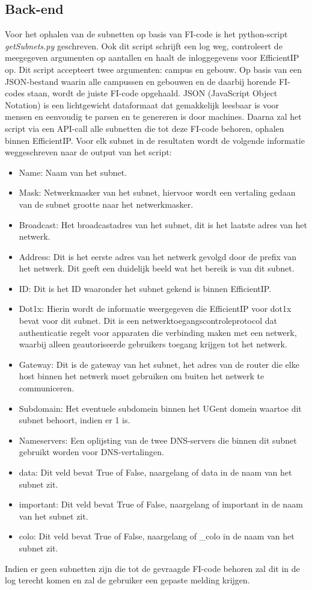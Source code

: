\subsection{Back-end}
Voor het ophalen van de subnetten op basis van FI-code is het python-script \textit{getSubnets.py} geschreven. Ook dit script schrijft een log weg, controleert de meegegeven argumenten op aantallen en haalt de inloggegevens voor EfficientIP op. Dit script accepteert twee argumenten: campus en gebouw. Op basis van een JSON-bestand waarin alle campussen en gebouwen en de daarbij horende FI-codes staan, wordt de juiste FI-code opgehaald. JSON (JavaScript Object Notation) is een lichtgewicht dataformaat dat gemakkelijk leesbaar is voor mensen en eenvoudig te parsen en te genereren is door machines. Daarna zal het script via een API-call alle subnetten die tot deze FI-code behoren, ophalen binnen EfficientIP. Voor elk subnet in de resultaten wordt de volgende informatie weggeschreven naar de output van het script:
\begin{itemize}
    \item Name: Naam van het subnet.
    \item Mask: Netwerkmasker van het subnet, hiervoor wordt een vertaling gedaan van de subnet grootte naar het netwerkmasker.
    \item Broadcast: Het broadcastadres van het subnet, dit is het laatste adres van het netwerk.
    \item Address: Dit is het eerste adres van het netwerk gevolgd door de prefix van het netwerk. Dit geeft een duidelijk beeld wat het bereik is van dit subnet.
    \item ID: Dit is het ID waaronder het subnet gekend is binnen EfficientIP.
    \item Dot1x: Hierin wordt de informatie weergegeven die EfficientIP voor dot1x bevat voor dit subnet. Dit is een netwerktoegangscontroleprotocol dat authenticatie regelt voor apparaten die verbinding maken met een netwerk, waarbij alleen geautoriseerde gebruikers toegang krijgen tot het netwerk.
    \item Gateway: Dit is de gateway van het subnet, het adres van de router die elke host binnen het netwerk moet gebruiken om buiten het netwerk te communiceren.
    \item Subdomain: Het eventuele subdomein binnen het UGent domein waartoe dit subnet behoort, indien er 1 is.
    \item Nameservers: Een oplijsting van de twee DNS-servers die binnen dit subnet gebruikt worden voor DNS-vertalingen.
    \item data: Dit veld bevat True of False, naargelang of data in de naam van het subnet zit.
    \item important: Dit veld bevat True of False, naargelang of important in de naam van het subnet zit.
    \item colo: Dit veld bevat True of False, naargelang of \_colo in de naam van het subnet zit.
\end{itemize}
Indien er geen subnetten zijn die tot de gevraagde FI-code behoren zal dit in de log terecht komen en zal de gebruiker een gepaste melding krijgen.

